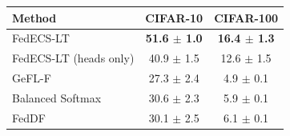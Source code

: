 \begin{tabular}{lcc}
\toprule
Method & CIFAR-10 & CIFAR-100\\
\midrule
FedECS-LT & \textbf{51.6 $\pm$ 1.0} & \textbf{16.4 $\pm$ 1.3}\\
FedECS-LT (heads only) & 40.9 $\pm$ 1.5 & 12.6 $\pm$ 1.5\\
GeFL-F & 27.3 $\pm$ 2.4 & 4.9 $\pm$ 0.1\\
Balanced Softmax & 30.6 $\pm$ 2.3 & 5.9 $\pm$ 0.1\\
FedDF & 30.1 $\pm$ 2.5 & 6.1 $\pm$ 0.1\\
\bottomrule
\end{tabular}
